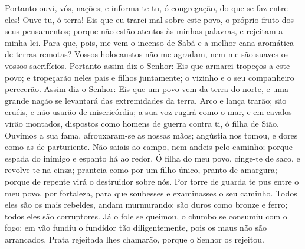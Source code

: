 Portanto ouvi, vós, nações; e informa-te tu, ó congregação, do
que se faz entre eles! Ouve tu, ó terra! Eis que eu trarei
mal sobre este povo, o próprio fruto dos seus pensamentos; porque
não estão atentos às minhas palavras, e rejeitam a minha lei.
Para que, pois, me vem o incenso de Sabá e a melhor cana
aromática de terras remotas? Vossos holocaustos não me agradam, nem
me são suaves os vossos sacrifícios. Portanto assim diz o
Senhor: Eis que armarei tropeços a este povo; e tropeçarão neles
pais e filhos juntamente; o vizinho e o seu companheiro perecerão.
Assim diz o Senhor: Eis que um povo vem da terra do norte, e
uma grande nação se levantará das extremidades da terra. Arco
e lança trarão; são cruéis, e não usarão de misericórdia; a sua voz
rugirá como o mar, e em cavalos virão montados, dispostos como
homens de guerra contra ti, ó filha de Sião. Ouvimos a sua
fama, afrouxaram-se as nossas mãos; angústia nos tomou, e dores como
as de parturiente. Não saiais ao campo, nem andeis pelo
caminho; porque espada do inimigo e espanto há ao redor. Ó
filha do meu povo, cinge-te de saco, e revolve-te na cinza; pranteia
como por um filho único, pranto de amargura; porque de repente virá
o destruidor sobre nós. Por torre de guarda te pus entre o
meu povo, por fortaleza, para que soubesses e examinasses o seu
caminho. Todos eles são os mais rebeldes, andam murmurando;
são duros como bronze e ferro; todos eles são corruptores. Já
o fole se queimou, o chumbo se consumiu com o fogo; em vão fundiu o
fundidor tão diligentemente, pois os maus não são arrancados.
Prata rejeitada lhes chamarão, porque o Senhor os rejeitou.

\medskip


